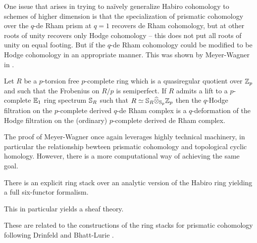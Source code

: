 One issue that arises in trying to na\"{i}vely generalize Habiro cohomology to schemes of higher dimension is that the specialization of prismatic cohomology over the $q$-de Rham prism at $q=1$ recovers de Rham cohomology, but at other roots of unity recovers only Hodge cohomology -- this does not put all roots of unity on equal footing. But if the $q$-de Rham cohomology could be modified to be Hodge cohomology in an appropriate manner. This was shown by Meyer-Wagner in \cite{MeyerWagner}. 
\begin{theorem}\label{thm: MeyerWagner main theorem}
    Let $R$ be a $p$-torsion free $p$-complete ring which is a quasiregular quotient over $\mathbb{Z}_{p}$ and such that the Frobenius on $R/p$ is semiperfect. If $R$ admits a lift to a $p$-complete $\mathbb{E}_{1}$ ring spectrum $\mathbb{S}_{R}$ such that $R\simeq \mathbb{S}_{R}\widehat{\otimes}_{\mathbb{S}_{p}}\mathbb{Z}_{p}$ then the $q$-Hodge filtration on the $p$-complete derived $q$-de Rham complex is a $q$-deformation of the Hodge filtration on the (ordinary) $p$-complete derived de Rham complex. 
\end{theorem} 
The proof of Meyer-Wagner once again leverages highly technical machinery, in particular the relationship bewteen prismatic cohomology and topological cyclic homology. However, there is a more computational way of achieving the same goal.
\begin{theorem}[Scholze]\label{thm: analytic Habiro cohomology}
    There is an explicit ring stack over an analytic version of the Habiro ring yielding a full six-functor formalism.
\end{theorem}
\begin{remark}
    This in particular yields a sheaf theory.
\end{remark}
These are related to the constructions of the ring stacks for prismatic cohomology following Drinfeld \cite{DrinfeldPrismatization} and Bhatt-Lurie \cite{BhattLurieAbsolute}.